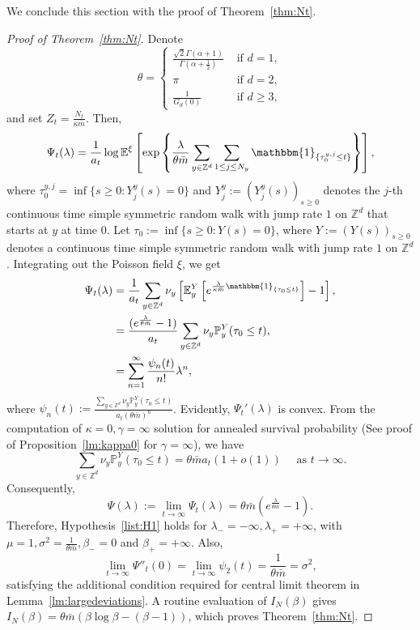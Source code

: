\documentclass{article}[12pt]
\theoremstyle{definition}
\newcommand{\Z}{\mathbb{Z}}
\newcommand{\pr}{\mathbb{P}}
\newcommand{\E}{\mathbb{E}}
\newcommand{\1}{\mathbbm{1}}
\begin{document}
We conclude this section with the proof of Theorem~\ref{thm:Nt}.
\begin{proof}[Proof of Theorem~\ref{thm:Nt}]
    Denote $$\theta = \begin{cases}
        \frac{\sqrt{2}\Gamma(\alpha+1)}{\Gamma(\alpha +\frac{1}{2})} & \text{ if }d=1,\\
        \pi & \text{ if }d=2,\\
        \frac{1}{G_d(0)} & \text{ if }d\ge 3,
    \end{cases}$$
    and set $Z_t = \frac{N_t}{\kappa \bar{m}}$. Then,
    $$\Psi_t(\lambda) = \frac{1}{a_t}\log\E^\xi\left[\exp\left\{\frac{\lambda}{\theta \bar{m}}\sum_{y\in\Z^d}\sum_{1\le j\le N_y}\1_{\{\tau^{y,j}_0\le t\}}\right\}\right],$$
    where $\tau^{y,j}_0 = \inf\{s\ge 0: Y^{y}_j(s) = 0\}$ and $Y_j^y := (Y_j^y (s))_{s \geq 0}$ denotes the $j$-th continuous time simple symmetric random walk with jump rate $1$ on $\Z^d$ that starts at $y$ at time $0$. Let $\tau_0 := \inf\{s\ge 0: Y(s) = 0\}$, where $Y := (Y(s))_{s \geq 0}$ denotes a continuous time simple symmetric random walk with jump rate $1$ on $\Z^d$. Integrating out the Poisson field $\xi$, we get
    \begin{align}
        \Psi_t(\lambda) &= \frac{1}{a_t}\sum_{y\in \Z^d}\nu_y \left[\E^Y_y\left[e^{\frac{\lambda}{\kappa \bar{m}}\1_{\{\tau_0\le t\}}}\right] - 1\right],\nonumber\\
        &= \frac{(e^{\frac{\lambda}{\theta\bar{m}}}-1)}{a_t}\sum_{y\in \Z^d}\nu_y \pr^Y_y(\tau_0\le t),\nonumber\\
        &= \sum_{n=1}^\infty \frac{\psi_n(t)}{n!}\lambda^n,\nonumber
    \end{align}
where $\psi_n(t):= \frac{\sum_{y\in \Z^d}\nu_y \pr^Y_y(\tau_0\le t)}{a_t(\theta\bar{m})^n}$. Evidently, $\Psi_t'(\lambda)$ is convex. From the computation of $\kappa=0, \gamma = \infty$ solution for annealed survival probability (See proof of Proposition~\ref{lm:kappa0} for $\gamma=\infty$), we have $$\sum_{y\in \Z^d}\nu_y \pr^Y_y(\tau_0\le t) = \theta \bar{m}a_t(1+o(1)) \quad\text{ as } t\to \infty.$$
Consequently, 
$$\Psi(\lambda):= \lim_{t\to \infty}\Psi_t(\lambda) =  \theta\bar{m}(e^{\frac{\lambda}{\theta\bar{m}}}-1).$$
Therefore, Hypothesis~\ref{list:H1} holds for $\lambda_- = -\infty, \lambda_+ = +\infty$, with $\mu = 1, \sigma^2= \frac{1}{\theta\bar{m}},\beta_- = 0$ and $\beta_+ = +\infty$. Also, 
$$\lim_{t \to \infty}\Psi''_t(0) = \lim_{t\to\infty}\psi_2(t) = \frac{1}{\theta\bar{m}} = \sigma^2,$$
satisfying the additional condition required for central limit theorem in Lemma~\ref{lm:largedeviations}. A routine evaluation of $I_N(\beta)$ gives $I_N(\beta) = \theta\bar{m}(\beta\log \beta - (\beta-1))$, which proves Theorem~\ref{thm:Nt}.
\end{proof}
\end{document}

